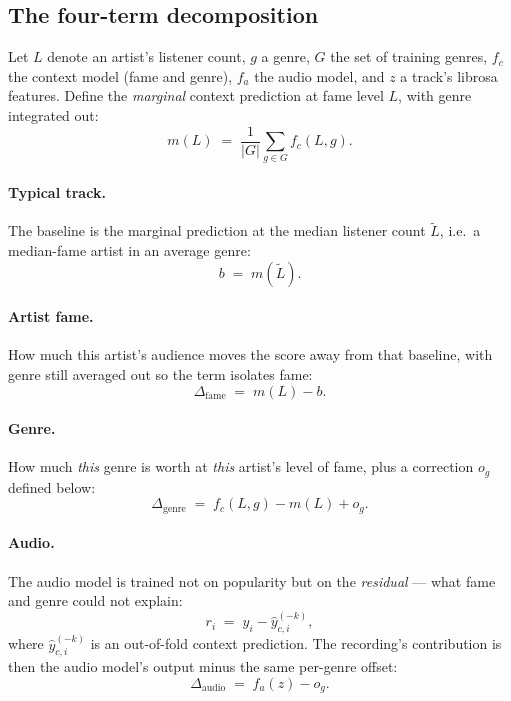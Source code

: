 \documentclass[10pt,twocolumn]{article}
\begin{document}
\subsection{The four-term decomposition}

Let $L$ denote an artist's listener count, $g$ a genre, $G$ the set of training
genres, $f_c$ the context model (fame and genre), $f_a$ the audio model, and $z$
a track's librosa features. Define the \emph{marginal} context prediction at
fame level $L$, with genre integrated out:
\begin{equation}
m(L) \;=\; \frac{1}{|G|}\sum_{g \in G} f_c(L, g).
\end{equation}

\paragraph{Typical track.} The baseline is the marginal prediction at the median
listener count $\tilde{L}$, i.e.\ a median-fame artist in an average genre:
\begin{equation}
b \;=\; m(\tilde{L}).
\end{equation}

\paragraph{Artist fame.} How much this artist's audience moves the score away
from that baseline, with genre still averaged out so the term isolates fame:
\begin{equation}
\Delta_{\text{fame}} \;=\; m(L) - b.
\end{equation}

\paragraph{Genre.} How much \emph{this} genre is worth at \emph{this} artist's
level of fame, plus a correction $o_g$ defined below:
\begin{equation}
\Delta_{\text{genre}} \;=\; f_c(L, g) - m(L) + o_g .
\end{equation}

\paragraph{Audio.} The audio model is trained not on popularity but on the
\emph{residual} --- what fame and genre could not explain:
\begin{equation}
r_i \;=\; y_i - \hat{y}^{(-k)}_{c,i},
\end{equation}
where $\hat{y}^{(-k)}_{c,i}$ is an out-of-fold context prediction. The
recording's contribution is then the audio model's output minus the same
per-genre offset:
\begin{equation}
\Delta_{\text{audio}} \;=\; f_a(z) - o_g .
\end{equation}
\end{document}
